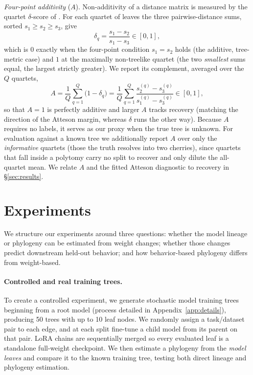 \documentclass{article}
\theoremstyle{definition}
\theoremstyle{plain}
\begin{document}
\textit{Four-point additivity} ($A$). Non-additivity of a distance matrix is measured by the quartet
$\delta$-score of \citet{holland2002delta}. For each quartet of leaves the three pairwise-distance sums,
sorted $s_1\ge s_2\ge s_3$, give
\[
  \delta_q=\frac{s_1-s_2}{s_1-s_3}\in[0,1] ,
\]
which is $0$ exactly when the four-point condition $s_1=s_2$ holds \citep{sempleSteel2003phylogenetics}
(the additive, tree-metric case) and $1$ at the maximally non-treelike quartet (the two \emph{smallest}
sums equal, the largest strictly greater). We report its complement, averaged over the $Q$ quartets,
\[
  A=\frac{1}{Q}\sum_{q=1}^{Q}\bigl(1-\delta_q\bigr)
   =\frac{1}{Q}\sum_{q=1}^{Q}\frac{s_2^{(q)}-s_3^{(q)}}{s_1^{(q)}-s_3^{(q)}}\in[0,1] ,
\]
so that $A=1$ is perfectly additive and larger $A$ tracks recovery (matching the direction of the
Atteson margin, whereas $\delta$ runs the other way). Because $A$ requires no labels,
it serves as our proxy when the true tree is unknown. For evaluation against a known tree we
additionally report $A$ over only the \emph{informative} quartets (those the truth resolves into two
cherries), since quartets that fall inside a polytomy carry no split to recover and only dilute the
all-quartet mean. We relate $A$ and the fitted Atteson diagnostic to recovery in \S\ref{sec:results}.


\section{Experiments}
\label{sec:experiments}
We structure our experiments around three questions: whether the model lineage or phylogeny can be
estimated from weight changes; whether those changes predict downstream held-out behavior; and
how behavior-based phylogeny differs from weight-based.

\paragraph{Controlled and real training trees.}
\label{sec:exp:trees}

To create a controlled experiment, we generate stochastic model training trees beginning from a root model (process detailed in Appendix~\ref{app:details}), producing 50 trees with up to 10 leaf nodes. We randomly assign a task/dataset pair to each edge, and at each split fine-tune a child model from its parent on that pair. LoRA chains are sequentially merged so every evaluated leaf is a standalone full-weight checkpoint. We then estimate a phylogeny from the \textit{model leaves} and compare it to the known training tree, testing both direct lineage and phylogeny estimation.
\end{document}
